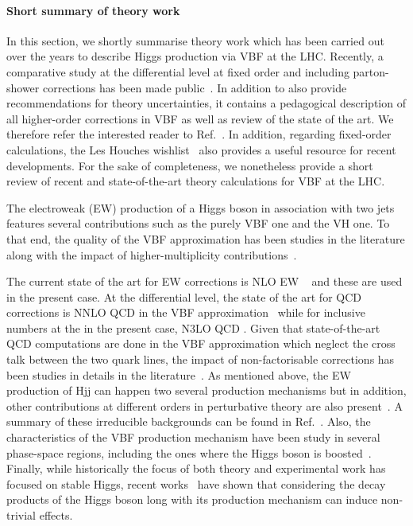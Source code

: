 
\paragraph{Short summary of theory work} In this section, we shortly summarise theory work which has been carried out over the years to describe Higgs production via VBF at the LHC.
Recently, a comparative study at the differential level at fixed order and including parton-shower corrections has been made public~\cite{TOBEADDED}.
In addition to also provide recommendations for theory uncertainties, it contains a pedagogical description of all higher-order corrections in VBF as well as review of the state of the art.
We therefore refer the interested reader to Ref.~\cite{TOBEADDED}.
In addition, regarding fixed-order calculations, the Les Houches wishlist~\cite{LesHouches} also provides a useful resource for recent developments.
For the sake of completeness, we nonetheless provide a short review of recent and state-of-the-art theory calculations for VBF at the LHC.

The electroweak (EW) production of a Higgs boson in association with two jets features several contributions such as the purely VBF one and the VH one.
To that end, the quality of the VBF approximation has been studies in the literature along with the impact of higher-multiplicity contributions~\cite{Figy:2003nv,Berger:2004pca,Ciccolini:2007jr,Bolzoni:2011cu,Campanario:2013fsa,Campanario:2018ppz,TOBEADDED}.

The current state of the art for EW corrections is NLO EW ~\cite{Ciccolini:2007jr,Ciccolini:2007ec} and these are used in the present case.
At the differential level, the state of the art for QCD corrections is
NNLO QCD in the VBF approximation~\cite{Cacciari:2015jma,Cruz-Martinez:2018rod} while for inclusive numbers at the in the present case, N3LO QCD \cite{Dreyer:2016oyx}.
Given that state-of-the-art QCD computations are done in the VBF approximation which neglect the cross talk between the two quark lines, the impact of non-factorisable corrections has been studies in details in the literature~\cite{Liu:2019tuy,Dreyer:2020urf,Asteriadis:2023nyl,Bronnum-Hansen:2023vzh,Long:2023mvc,Gates:2023iiv}.
As mentioned above, the EW production of Hjj can happen two several production mechanisms but in addition, other contributions at different orders in perturbative theory are also present~\cite{Andersen:2006ag,Andersen:2007mp,Harlander:2008xn,Greiner:2016awe,Greiner:2015jha,Andersen:2017kfc,Andersen:2018tnm,Andersen:2018kjg,Chen:2021azt,Andersen:2022zte}.
A summary of these irreducible backgrounds can be found in Ref.~\cite{TOBEADDED}.
Also, the characteristics of the VBF production mechanism have been study in several phase-space regions, including the ones where the Higgs boson is boosted~\cite{Becker:2020rjp,Buckley:2021gfw}.
Finally, while historically the focus of both theory and experimental work has focused on stable Higgs, recent works~\cite{Asteriadis:2021gpd,Asteriadis:2024nbg} have shown that considering the decay products of the Higgs boson long with its production mechanism can induce non-trivial effects.

